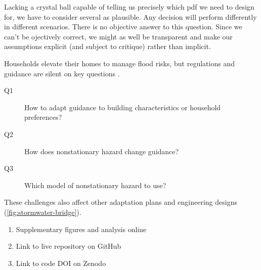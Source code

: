 \documentclass[12pt]{article}
\begin{document}
Lacking a crystal ball capable of telling us precisely which \gls{pdf} we need to design for, we have to consider several as plausible.
Any decision will perform differently in different scenarios.
There is no objective answer to this question.
Since we can't be ojectively correct, we might as well be transparent and make our assumptions explicit (and subject to critique) rather than implicit.

Households elevate their homes to manage flood risks, but regulations and guidance are silent on key questions \citep{zarekarizi_suboptimal:2020,xian_elevation:2017}.
\begin{description}
    \item[Q1] How to adapt guidance to building characteristics or household preferences?
    \item[Q2] How does nonstationary hazard change guidance?
    \item[Q3] Which model of nonstationary hazard to use?
\end{description}
These challenges also affect other adaptation plans and engineering designs (\cref{fig:stormwater-bridge}).

\begin{enumerate}
    \item Supplementary figures and analysis online
    \item Link to live repository on GitHub
    \item Link to code DOI on Zenodo
\end{enumerate}

\printbibliography
\end{document}
